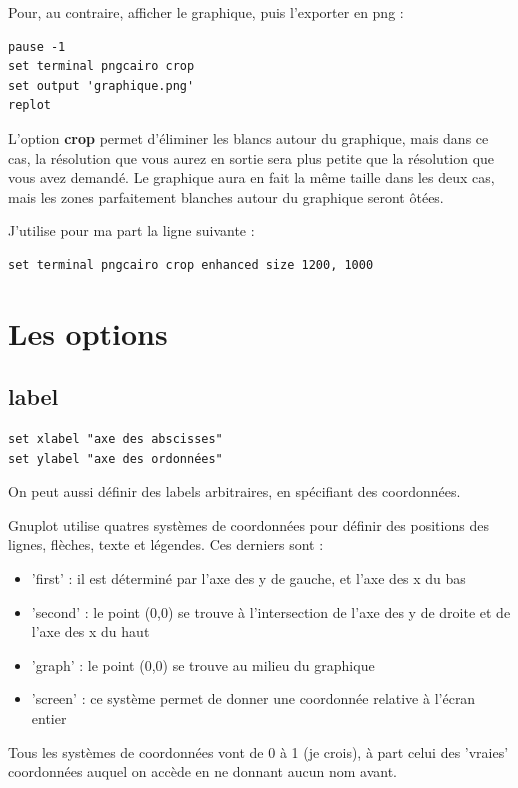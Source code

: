 \documentclass[a4paper,twoside]{article}
\begin{document}
Pour, au contraire, afficher le graphique, puis l'exporter en png : 
\begin{verbatim}
pause -1
set terminal pngcairo crop
set output 'graphique.png'
replot
\end{verbatim}

\bigskip

L'option \textbf{crop} permet d'éliminer les blancs autour du graphique, mais dans ce cas, la résolution que vous aurez en sortie sera plus petite que la résolution que vous avez demandé. Le graphique aura en fait la même taille dans les deux cas, mais les zones parfaitement blanches autour du graphique seront ôtées.

J'utilise pour ma part la ligne suivante : 
\begin{verbatim}
set terminal pngcairo crop enhanced size 1200, 1000
\end{verbatim}

\section{Les options}
\subsection{label}
\begin{verbatim}
set xlabel "axe des abscisses"
set ylabel "axe des ordonnées"
\end{verbatim}

\bigskip

On peut aussi définir des labels arbitraires, en spécifiant des coordonnées. 

Gnuplot utilise quatres systèmes de coordonnées pour définir des positions des lignes, flèches, texte et légendes. Ces derniers sont :
\begin{itemize}
\item 'first' : il est déterminé par l'axe des y de gauche, et l'axe des x du bas
\item 'second' : le point (0,0) se trouve à l'intersection de l'axe des y de droite et de l'axe des x du haut
\item 'graph' : le point (0,0) se trouve au milieu du graphique
\item 'screen' : ce système permet de donner une coordonnée relative à l'écran entier
\end{itemize}
Tous les systèmes de coordonnées vont de 0 à 1 (je crois), à part celui des 'vraies' coordonnées auquel on accède en ne donnant aucun nom avant.
\end{document}
